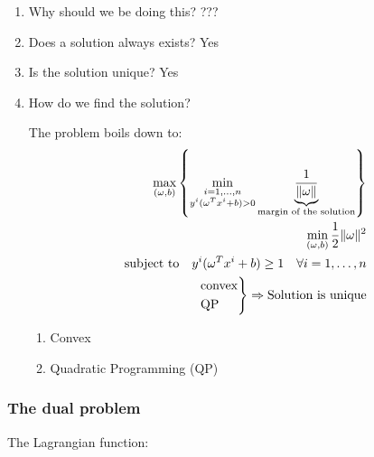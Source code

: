 \begin{enumerate}
  \item Why should we be doing this? ???
  \item Does a solution always exists? Yes
  \item Is the solution unique? Yes
  \item How do we find the solution?

The problem boils down to:
 \begin{align*}
  \max_{(\omega, b)}
  \left\{
    \min_{\substack{i=1,\dots, n \\ y^i(\omega^Tx^i + b) > 0}}
    \underbrace{\frac{1}{\lVert\omega\rVert}}_{\text{margin of the solution}}
  \right\} \\
  \min_{(\omega, b)} \frac{1}{2}\lVert\omega\rVert^2 \\
  \text{subject to} \quad y^i(\omega^Tx^i + b) \geq 1 \quad \forall i=1,\dots,n \\
  \begin{rcases*}
    \text{convex} \\
    \text{QP} \\
  \end{rcases*} \Rightarrow \text{Solution is unique}
\end{align*}

\begin{enumerate}
  \item Convex
  \item Quadratic Programming (QP)
\end{enumerate}

\end{enumerate}

\subsubsection{The dual problem}

The Lagrangian function:

